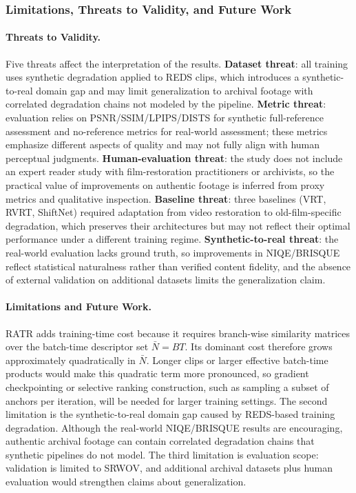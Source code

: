 \documentclass[symmetry,article,submit,pdftex,moreauthors]{Definitions/mdpi}
\begin{document}
\subsubsection{Limitations, Threats to Validity, and Future Work}
\label{subsec:limitations}

\paragraph{Threats to Validity.}
Five threats affect the interpretation of the results. \textbf{Dataset threat}: all training uses synthetic degradation applied to REDS clips, which introduces a synthetic-to-real domain gap and may limit generalization to archival footage with correlated degradation chains not modeled by the pipeline. \textbf{Metric threat}: evaluation relies on PSNR/SSIM/LPIPS/DISTS for synthetic full-reference assessment and no-reference metrics for real-world assessment; these metrics emphasize different aspects of quality and may not fully align with human perceptual judgments. \textbf{Human-evaluation threat}: the study does not include an expert reader study with film-restoration practitioners or archivists, so the practical value of improvements on authentic footage is inferred from proxy metrics and qualitative inspection. \textbf{Baseline threat}: three baselines (VRT, RVRT, ShiftNet) required adaptation from video restoration to old-film-specific degradation, which preserves their architectures but may not reflect their optimal performance under a different training regime. \textbf{Synthetic-to-real threat}: the real-world evaluation lacks ground truth, so improvements in NIQE/BRISQUE reflect statistical naturalness rather than verified content fidelity, and the absence of external validation on additional datasets limits the generalization claim.

\paragraph{Limitations and Future Work.}
RATR adds training-time cost because it requires branch-wise similarity matrices over the batch-time descriptor set $\bar{N}=BT$. Its dominant cost therefore grows approximately quadratically in $\bar{N}$. Longer clips or larger effective batch-time products would make this quadratic term more pronounced, so gradient checkpointing or selective ranking construction, such as sampling a subset of anchors per iteration, will be needed for larger training settings. The second limitation is the synthetic-to-real domain gap caused by REDS-based training degradation. Although the real-world NIQE/BRISQUE results are encouraging, authentic archival footage can contain correlated degradation chains that synthetic pipelines do not model. The third limitation is evaluation scope: validation is limited to SRWOV, and additional archival datasets plus human evaluation would strengthen claims about generalization.
\end{document}
